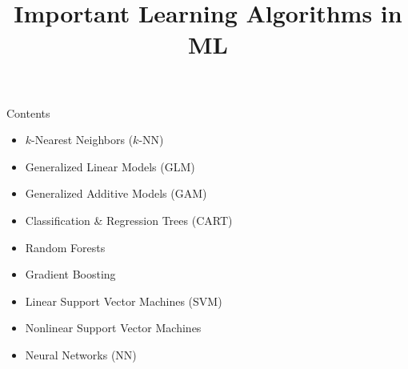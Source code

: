\documentclass[11pt,compress,t,notes=noshow, xcolor=table]{beamer}
\title{Important Learning Algorithms in ML}
\begin{document}

\sloppy

\begin{frame2}{Contents}
  \begin{itemize}
    \item $k$-Nearest Neighbors ($k$-NN)
    \item Generalized Linear Models (GLM)
    \item Generalized Additive Models (GAM)
    \item Classification \& Regression Trees (CART)
    \item Random Forests
    \item Gradient Boosting
    \item Linear Support Vector Machines (SVM)
    \item Nonlinear Support Vector Machines
    \item Neural Networks (NN)
  \end{itemize}
\end{frame2}
\end{document}
